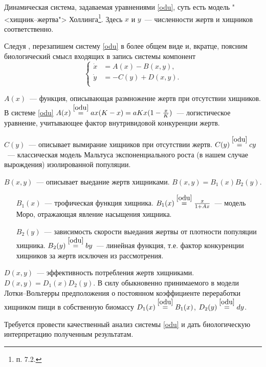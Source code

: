 \documentclass[oneside,final,12pt]{article}
\theoremstyle{plain}
\theoremstyle{remark}
\theoremstyle{definition}
\theoremstyle{plain}
\begin{document}
		Динамическая система, задаваемая уравнениями \eqref{odu}, суть есть модель "<хищник--жертва"> Холлинга\footnote{\cite{DSMB} п. 7.2.}. Здесь \(x\) и \(y\)~--- численности жертв и хищников соответственно. 

		\bigskip
		Следуя \cite{DSMB}, перезапишем систему \eqref{odu} в более общем виде и, вкратце, поясним биологический смысл входящих в запись системы компонент
		\[		\left\{ \begin{aligned}
				\dot x & = A(x) - B(x,y),\\
				\dot y & = -C(y) + D(x,y).	\\
				\end{aligned}\right. \]
		
		{\newcommand*\eqodu{\stackrel{\eqref{odu}}{=}}
		\(A(x)\)~--- функция, описывающая размножение жертв при отсутствии хищников.  В системе \eqref{odu} \(A(x) \eqodu ax(K-x) = aKx(1 - \frac{x}{K})\)~--- логистическое уравнение, учитывающее фактор внутривидовой конкуренции жертв.\par
 		\(C(y)\)~--- описывает вымирание хищников при отсутствии жертв. \(C(y) \eqodu cy\)~--- классическая модель Мальтуса экспоненциального роста (в нашем случае вырождения) изолированной популяции.\par
		\(B(x,y)\)~--- описывает выедание жертв хищниками. \(B(x,y) = B_1(x)B_2(y).\)
			\begin{itemize}
				\item[\(B_1(x)\)~---] трофическая функция хищника. \(B_1(x) \eqodu \frac{x}{1+Ax}\)~--- модель Моро, отражающая явление насыщения хищника.
				\item[\(B_2(y)\)~---] зависимость скорости выедания жертвы от плотности популяции хищника. \(B_2(y) \eqodu by\)~--- линейная функция, т.е. фактор конкуренции хищников за жертв исключен из рассмотрения.
			\end{itemize}
		\(D(x,y)\)~--- эффективность потребления жертв хищниками. \(D(x,y) = D_1(x)D_2(y).\) В силу обыкновенно принимаемого в модели Лотки--Вольтерры предположения о постоянном коэффициенте переработки хищником пищи в собственную биомассу \(D_1(x) \eqodu B_1(x)\), \(D_2(y) \eqodu dy\).
		}

		\bigskip
		Требуется провести качественный анализ системы \eqref{odu} и дать биологическую интерпретацию полученным результатам.
\end{document}
